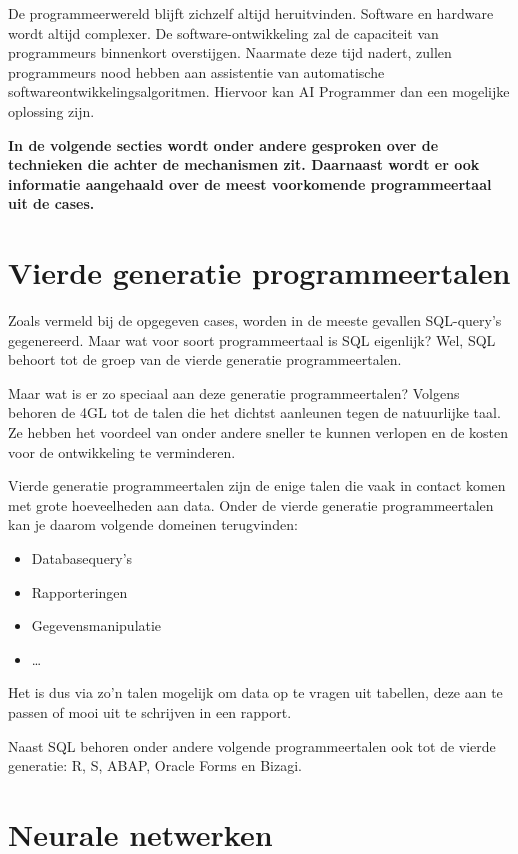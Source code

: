 De programmeerwereld blijft zichzelf altijd heruitvinden. Software en hardware wordt altijd complexer. De software-ontwikkeling zal de capaciteit van programmeurs binnenkort overstijgen. Naarmate deze tijd nadert, zullen programmeurs nood hebben aan assistentie van automatische softwareontwikkelingsalgoritmen. Hiervoor kan AI Programmer dan een mogelijke oplossing zijn.

\textbf{In de volgende secties wordt onder andere gesproken over de technieken die achter de mechanismen zit. Daarnaast wordt er ook informatie aangehaald over de meest voorkomende programmeertaal uit de cases.}
\section{Vierde generatie programmeertalen}

Zoals vermeld bij de opgegeven cases, worden in de meeste gevallen SQL-query’s gegenereerd. Maar wat voor soort programmeertaal is SQL eigenlijk? Wel, SQL behoort tot de groep van de vierde generatie programmeertalen. 

Maar wat is er zo speciaal aan deze generatie programmeertalen? Volgens \textcite{fourthgenpl} behoren de 4GL tot de talen die het dichtst aanleunen tegen de natuurlijke taal. Ze hebben het voordeel van onder andere sneller te kunnen verlopen en de kosten voor de ontwikkeling te verminderen.

Vierde generatie programmeertalen zijn de enige talen die vaak in contact komen met grote hoeveelheden aan data. Onder de vierde generatie programmeertalen kan je daarom volgende domeinen terugvinden:
\begin{itemize}
	\item Databasequery’s
	\item Rapporteringen
	\item Gegevensmanipulatie
	\item \dots
\end{itemize}

Het is dus via zo’n talen mogelijk om data op te vragen uit tabellen, deze aan te passen of mooi uit te schrijven in een rapport.

Naast SQL behoren onder andere volgende programmeertalen ook tot de vierde generatie: R, S, ABAP, Oracle Forms en Bizagi.

\section{Neurale netwerken}

